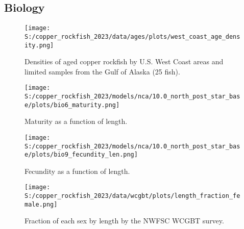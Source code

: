 \documentclass[11pt,
  letterpaper,
]{article}
\begin{document}
\pagebreak

\subsection{Biology}\label{biology}

\begin{figure}
{\centering
\texttt{[image: S:/copper\_rockfish\_2023/data/ages/plots/west\_coast\_age\_density.png]}
}
\caption{Densities of aged copper rockfish by U.S. West Coast areas and limited samples from the Gulf of Alaska (25 fish).\label{fig:west-coast-age-density}}
\end{figure}

\pagebreak

\begin{figure}
{\centering
\texttt{[image: S:/copper\_rockfish\_2023/models/nca/10.0\_north\_post\_star\_base/plots/bio6\_maturity.png]}
}
\caption{Maturity as a function of length.\label{fig:maturity}}
\end{figure}

\pagebreak

\begin{figure}
{\centering
\texttt{[image: S:/copper\_rockfish\_2023/models/nca/10.0\_north\_post\_star\_base/plots/bio9\_fecundity\_len.png]}
}
\caption{Fecundity as a function of length.\label{fig:fecundity}}
\end{figure}

\pagebreak

\begin{figure}
{\centering
\texttt{[image: S:/copper\_rockfish\_2023/data/wcgbt/plots/length\_fraction\_female.png]}
}
\caption{Fraction of each sex by length by the NWFSC WCGBT survey.\label{fig:frac-sex-len}}
\end{figure}
\end{document}
